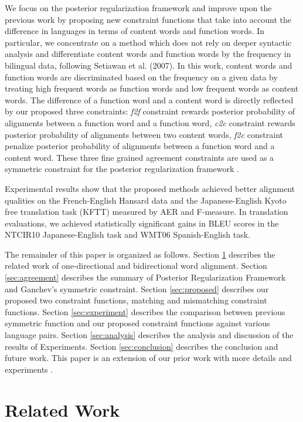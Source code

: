 \documentclass[english]{jnlp_1.4}
\begin{document}
We focus on the posterior regularization framework and improve upon the previous work by proposing new constraint functions that take into account the difference in languages in terms of content words and function words.
In particular, we concentrate on a method which does not rely on deeper syntactic analysis and differentiate content words and function words by the frequency in bilingual data,
following Setiawan et al. (2007).
In this work, content words and function words are discriminated based on the frequency on a given data by treating high frequent words as function words and low frequent words as content words.
The difference of a function word and a content word is directly reflected by our proposed three constraints:
\textit{f2f}  constraint rewards posterior probability of alignments between a function word and a function word,
\textit{c2c}  constraint rewards posterior probability of alignments between two content words,
\textit{f2c}  constraint penalize posterior probability of alignments between a function word and a content word.
These three fine grained agreement constraints are used as a symmetric constraint for the posterior regularization framework \cite{ganchev2010posterior}. 

Experimental results show that the proposed methods achieved better alignment qualities on the French-English Hansard data and the Japanese-English Kyoto free translation task (KFTT) measured by AER and F-measure.
In translation evaluations, we achieved statistically significant gains in BLEU scores in the NTCIR10 Japanese-English task and WMT06 Spanish-English task.

The remainder of this paper is organized as follows.
Section \ref{sec:related} describes the related work of one-directional and bidirectional word alignment.
Section \ref{sec:agreement} describes the summary of Posterior Regularization Framework and Ganchev's symmetric constraint.
Section \ref{sec:proposed} describes our proposed two constraint functions, matching and mismatching constraint functions.
Section \ref{sec:experiment} describes the comparison between previous symmetric function and our proposed constraint functions against various language pairs.
Section \ref{sec:analysis} describes the analysis and discussion of the results of Experiments.
Section \ref{sec:conclusion} describes the conclusion and future work.
This paper is an extension of our prior work with more details and experiments \cite{kamigaitounsupervised}.


\section{Related Work}
\label{sec:related}
\end{document}
